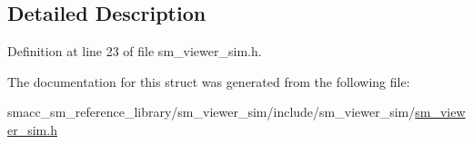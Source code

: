 \subsection{Detailed Description}


Definition at line 23 of file sm\+\_\+viewer\+\_\+sim.\+h.



The documentation for this struct was generated from the following file\+:\begin{DoxyCompactItemize}
\item 
smacc\+\_\+sm\+\_\+reference\+\_\+library/sm\+\_\+viewer\+\_\+sim/include/sm\+\_\+viewer\+\_\+sim/\hyperlink{sm__viewer__sim_8h}{sm\+\_\+viewer\+\_\+sim.\+h}\end{DoxyCompactItemize}
